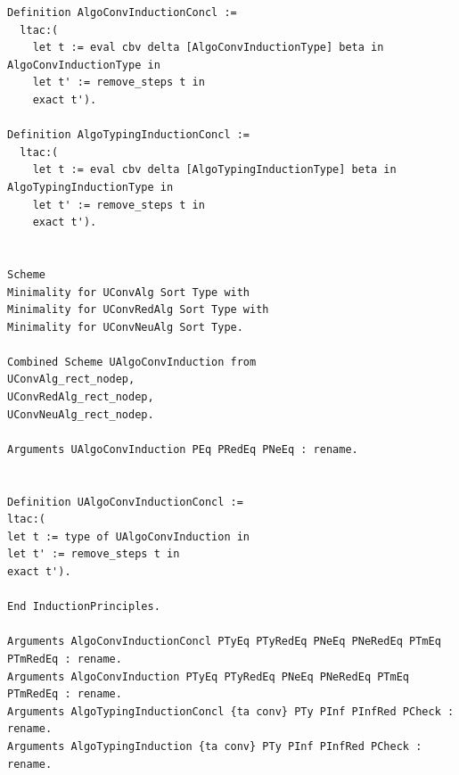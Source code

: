 \begin{lstlisting}
Definition AlgoConvInductionConcl :=
  ltac:(
    let t := eval cbv delta [AlgoConvInductionType] beta in AlgoConvInductionType in
    let t' := remove_steps t in
    exact t').

Definition AlgoTypingInductionConcl :=
  ltac:(
    let t := eval cbv delta [AlgoTypingInductionType] beta in AlgoTypingInductionType in
    let t' := remove_steps t in
    exact t').


Scheme 
Minimality for UConvAlg Sort Type with
Minimality for UConvRedAlg Sort Type with
Minimality for UConvNeuAlg Sort Type.

Combined Scheme UAlgoConvInduction from
UConvAlg_rect_nodep,
UConvRedAlg_rect_nodep,
UConvNeuAlg_rect_nodep.

Arguments UAlgoConvInduction PEq PRedEq PNeEq : rename.


Definition UAlgoConvInductionConcl :=
ltac:(
let t := type of UAlgoConvInduction in
let t' := remove_steps t in
exact t').

End InductionPrinciples.

Arguments AlgoConvInductionConcl PTyEq PTyRedEq PNeEq PNeRedEq PTmEq PTmRedEq : rename.
Arguments AlgoConvInduction PTyEq PTyRedEq PNeEq PNeRedEq PTmEq PTmRedEq : rename.
Arguments AlgoTypingInductionConcl {ta conv} PTy PInf PInfRed PCheck : rename.
Arguments AlgoTypingInduction {ta conv} PTy PInf PInfRed PCheck : rename.
\end{lstlisting}

